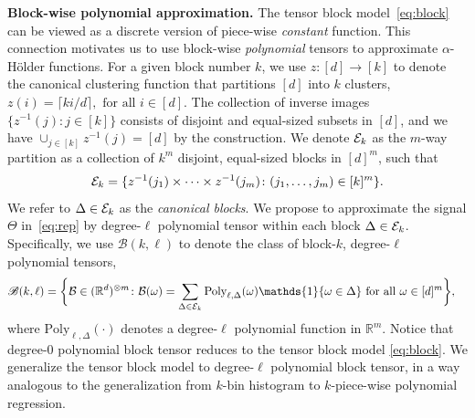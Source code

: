 \documentclass{article}
\newtheorem{lem}{Lemma}
\theoremstyle{definition}
\def\caliB{\mathscr{B}}
\begin{document}
{\bf Block-wise polynomial approximation.} The tensor block model~\eqref{eq:block} can be viewed as a discrete version of piece-wise \emph{constant} function. This connection motivates us to use block-wise \emph{polynomial} tensors to approximate $\alpha$-H\"older functions.  For a given block number $k$, we use $z\colon[d]\rightarrow [k]$ to denote the canonical clustering function that partitions $[d]$ into $k$ clusters,  $z(i) = \lceil ki/d\rceil,  \text{ for all } i\in[d].$
The collection of inverse images $\{z^{-1}(j)\colon j\in[k]\}$ consists of  disjoint and equal-sized subsets in $[d]$, and we have $\cup_{j\in[k]}z^{-1}(j) = [d]$ by the construction. We denote $\mathcal{E}_k$ as the $m$-way partition as a collection of $k^m$ disjoint, equal-sized blocks in $[d]^m$, such that 
\begin{align}\label{eq:blockind}
    \mathcal{E}_k = \{z^{-1}(j_1)\times\cdots\times z^{-1}(j_m)\colon (j_1,\ldots,j_m)\in [k]^m\}.
\end{align}
We refer to $\Delta\in \mathcal{E}_k$ as the \emph{canonical blocks}. We propose to approximate the signal $\Theta$ in~\eqref{eq:rep} by degree-$\ell$ polynomial tensor within each block $\Delta \in \mathcal{E}_k$. Specifically, we use $\caliB(k,\ell)$ to denote the class of block-$k$, degree-$\ell$ polynomial tensors,
\begin{align}
    \caliB(k,\ell) = \bigg\{&\tB\in(\mathbb{R}^d)^{\otimes m}\colon \tB(\omega) = \sum_{\Delta\in\tE_k}\text{Poly}_{\ell,\Delta}(\omega)\mathds{1}\{\omega\in\Delta\}\text{ for all } \omega\in[d]^m\bigg\},
\end{align}
where $\text{Poly}_{\ell,\Delta}(\cdot)$ denotes a degree-$\ell$ polynomial function in $\mathbb{R}^m$. Notice that degree-0 polynomial block tensor reduces to the tensor block model \eqref{eq:block}. We generalize the tensor block model to degree-$\ell$ polynomial block tensor, in a way analogous to the generalization from $k$-bin histogram to $k$-piece-wise polynomial regression.

\end{document}
